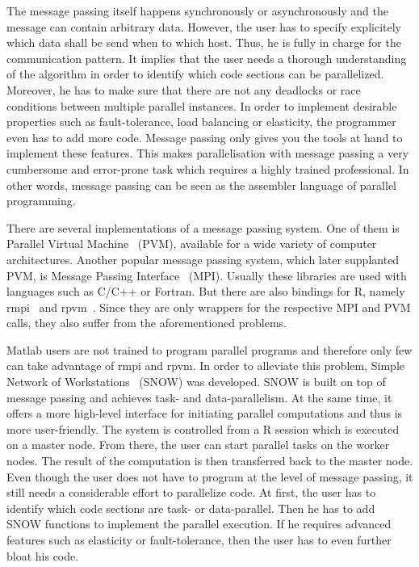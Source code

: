 The message passing itself happens synchronously or asynchronously and the message can contain arbitrary data.
However, the user has to specify explicitely which data shall be send when to which host.
Thus, he is fully in charge for the communication pattern.
It implies that the user needs a thorough understanding of the algorithm in order to identify which code sections can be parallelized.
Moreover, he has to make sure that there are not any deadlocks or race conditions between multiple parallel instances.
In order to implement desirable properties such as fault-tolerance, load balancing or elasticity, the programmer even has to add more code.
Message passing only gives you the tools at hand to implement these features.
This makes parallelisation with message passing a very cumbersome and error-prone task which requires a highly trained professional.
In other words, message passing can be seen as the assembler language of parallel programming.

There are several implementations of a message passing system.
One of them is Parallel Virtual Machine~\cite{geist:1994a} (PVM), available for a wide variety of computer architectures.
Another popular message passing system, which later supplanted PVM, is Message Passing Interface~\cite{lusk:2009a} (MPI).
Usually these libraries are used with languages such as C/C++ or Fortran.
But there are also bindings for R, namely rmpi~\cite{rmpi} and rpvm~\cite{rpvm}.
Since they are only wrappers for the respective MPI and PVM calls, they also suffer from the aforementioned problems.

Matlab users are not trained to program parallel programs and therefore only few can take advantage of rmpi and rpvm.
In order to alleviate this problem, Simple Network of Workstations~\cite{tierney:pv0hros2008a} (SNOW) was developed.
SNOW is built on top of message passing and achieves task- and data-parallelism.
At the same time, it offers a more high-level interface for initiating parallel computations and thus is more user-friendly.
The system is controlled from a R session which is executed on a master node.
From there, the user can start parallel tasks on the worker nodes.
The result of the computation is then transferred back to the master node.
Even though the user does not have to program at the level of message passing, it still needs a considerable effort to parallelize code.
At first, the user has to identify which code sections are task- or data-parallel.
Then he has to add SNOW functions to implement the parallel execution.
If he requires advanced features such as elasticity or fault-tolerance, then the user has to even further bloat his code.

